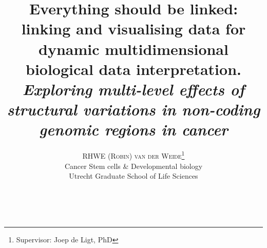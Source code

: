 \documentclass[twoside,fontsize=10pt]{article}
\title{\vspace{-15mm}\fontsize{18pt}{10pt}\normalfont\textbf{Everything should be linked: linking and visualising data for dynamic  multidimensional biological data interpretation.\\ \vspace{4 mm} {{\footnotesize \textit{Exploring multi-level effects of structural variations in non-coding genomic regions in cancer}}}}} %
\author{
\large
\textsc{RHWE (Robin) van der Weide}\thanks{Supervisor: Joep de Ligt, PhD}\\[2mm] %
\normalsize   Cancer Stem cells \& Developmental biology \\ %
\normalsize  Utrecht Graduate School of Life Sciences \\ %
\vspace{-5mm}
}
\date{}
\renewcommand{\abstractname}{}    %
\begin{document}
\maketitle %

\thispagestyle{fancy} %

\newpage
\mbox{   }
\newpage
\renewcommand{\abstractname}{\begin{center}
Summary of the research
\end{center}}    %
\end{document}
